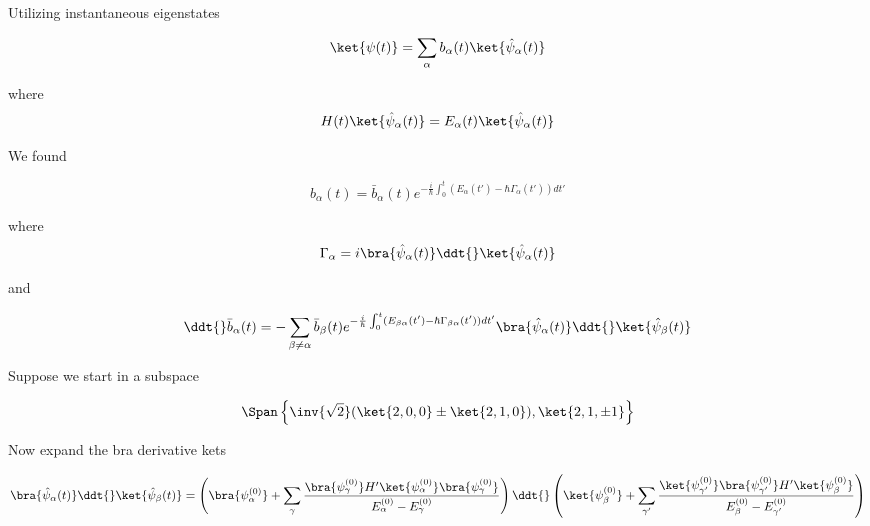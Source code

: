 Utilizing instantaneous eigenstates

\begin{equation}\label{eqn:qmTwoR3:390}
\ket{\psi(t)} = \sum_{\alpha} b_\alpha(t) \ket{\hat{\psi}_\alpha(t)}
\end{equation}

where
\begin{equation}\label{eqn:qmTwoR3:410}
H(t) \ket{\hat{\psi}_\alpha(t)}
= E_\alpha(t) \ket{\hat{\psi}_\alpha(t)}
\end{equation}

We found

\begin{equation}\label{eqn:qmTwoR3:430}
b_\alpha(t) = \bar{b}_\alpha(t) e^{-\frac{i}{\hbar} \int_0^t (E_\alpha(t') - \hbar \Gamma_\alpha(t')) dt'}
\end{equation}

where
\begin{equation}\label{eqn:qmTwoR3:450}
\Gamma_\alpha = i
\bra{\hat{\psi}_\alpha(t)}
\ddt{} \ket{\hat{\psi}_\alpha(t)}
\end{equation}

and

\begin{equation}\label{eqn:qmTwoR3:470}
\ddt{}\bar{b}_\alpha(t)
=
-\sum_{\beta \ne \alpha} \bar{b}_\beta(t)
e^{-\frac{i}{\hbar} \int_0^t (E_{\beta\alpha}(t') - \hbar \Gamma_{\beta\alpha}(t')) dt'}
\bra{\hat{\psi}_\alpha(t)}
\ddt{} \ket{\hat{\psi}_\beta(t)}
\end{equation}

Suppose we start in a subspace 

\begin{equation}\label{eqn:qmTwoR3:490}
\Span \left\{
\inv{\sqrt{2}}( \ket{2,0,0} \pm \ket{2,1,0} ), \ket{2, 1, \pm 1}
\right\}
\end{equation}

Now expand the bra derivative kets

\begin{equation}\label{eqn:qmTwoR3:510}
\bra{\hat{\psi}_\alpha(t)}
\ddt{} \ket{\hat{\psi}_\beta(t)}
=
\left(
\bra{\psi_{\alpha}^{(0)}} 
+\sum_{\gamma} \frac{ 
\bra{\psi_\gamma^{(0)}} H' \ket{\psi_\alpha^{(0)}} 
\bra{\psi_\gamma^{(0)}} 
}{
E_\alpha^{(0)} 
-E_\gamma^{(0)} 
}
\right)
\ddt{}
\left(
\ket{\psi_{\beta}^{(0)}} 
+\sum_{\gamma'} \frac{ 
\ket{\psi_{\gamma'}^{(0)}} 
\bra{\psi_{\gamma'}^{(0)}} H' \ket{\psi_\beta^{(0)}} 
}{
E_\beta^{(0)} 
-E_{\gamma'}^{(0)} 
}
\right)
\end{equation}

